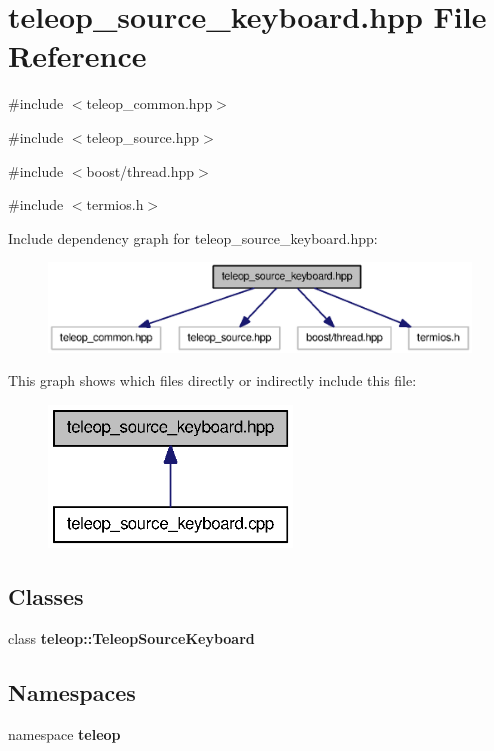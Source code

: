 \section{teleop\_\-source\_\-keyboard.hpp File Reference}
\label{teleop__source__keyboard_8hpp}
{\ttfamily \#include $<$teleop\_\-common.hpp$>$}\par
{\ttfamily \#include $<$teleop\_\-source.hpp$>$}\par
{\ttfamily \#include $<$boost/thread.hpp$>$}\par
{\ttfamily \#include $<$termios.h$>$}\par
Include dependency graph for teleop\_\-source\_\-keyboard.hpp:
\nopagebreak
\begin{figure}[H]
\begin{center}
\leavevmode
\includegraphics[width=400pt]{teleop__source__keyboard_8hpp__incl}
\end{center}
\end{figure}
This graph shows which files directly or indirectly include this file:
\nopagebreak
\begin{figure}[H]
\begin{center}
\leavevmode
\includegraphics[width=184pt]{teleop__source__keyboard_8hpp__dep__incl}
\end{center}
\end{figure}
\subsection*{Classes}
\begin{DoxyCompactItemize}
\item 
class {\bf teleop::TeleopSourceKeyboard}
\end{DoxyCompactItemize}
\subsection*{Namespaces}
\begin{DoxyCompactItemize}
\item 
namespace {\bf teleop}
\end{DoxyCompactItemize}
